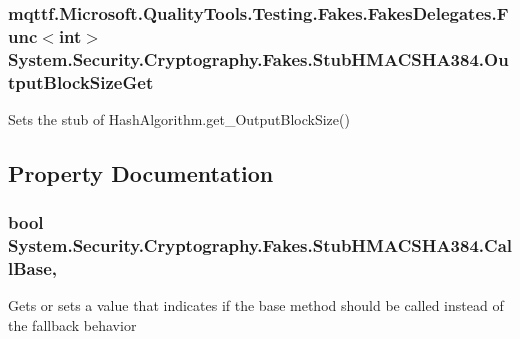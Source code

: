 \hypertarget{class_system_1_1_security_1_1_cryptography_1_1_fakes_1_1_stub_h_m_a_c_s_h_a384_a4c05bf2b862b8df1a5d92570e22d5910}{
\subsubsection[{Output\-Block\-Size\-Get}]{\setlength{\rightskip}{0pt plus 5cm}mqttf.\-Microsoft.\-Quality\-Tools.\-Testing.\-Fakes.\-Fakes\-Delegates.\-Func$<$int$>$ System.\-Security.\-Cryptography.\-Fakes.\-Stub\-H\-M\-A\-C\-S\-H\-A384.\-Output\-Block\-Size\-Get}}\label{class_system_1_1_security_1_1_cryptography_1_1_fakes_1_1_stub_h_m_a_c_s_h_a384_a4c05bf2b862b8df1a5d92570e22d5910}


Sets the stub of Hash\-Algorithm.\-get\-\_\-\-Output\-Block\-Size()



\subsection{Property Documentation}
\hypertarget{class_system_1_1_security_1_1_cryptography_1_1_fakes_1_1_stub_h_m_a_c_s_h_a384_a0871b6fcdad91496c6c42fd38e5da213}{
\subsubsection[{Call\-Base}]{\setlength{\rightskip}{0pt plus 5cm}bool System.\-Security.\-Cryptography.\-Fakes.\-Stub\-H\-M\-A\-C\-S\-H\-A384.\-Call\-Base\hspace{0.3cm}{\ttfamily [get]}, {\ttfamily [set]}}}\label{class_system_1_1_security_1_1_cryptography_1_1_fakes_1_1_stub_h_m_a_c_s_h_a384_a0871b6fcdad91496c6c42fd38e5da213}


Gets or sets a value that indicates if the base method should be called instead of the fallback behavior

